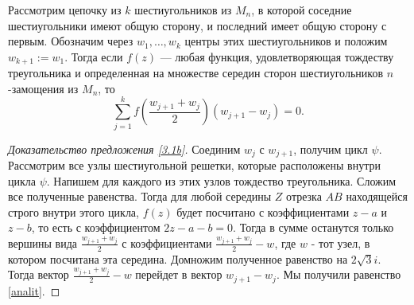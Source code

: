 \begin{suggestion} \label{3.1b}
Рассмотрим цепочку из $k$ шестиугольников из $M_n$, в которой соседние шестиугольники имеют общую сторону, и последний имеет общую сторону с первым. Обозначим через $w_1,\dots, w_{k}$ центры этих шестиугольников и положим $w_{k+1}:=w_1$. Тогда если $f(z)$ --- любая функция, удовлетворяющая тождеству треугольника и определенная на множестве середин сторон шестиугольников $n$-замощения из $M_n$, то
\begin{equation} \label{analit}
\sum\limits_{j=1}^{k} f\left(\frac{w_{j+1}+w_{j}}{2}\right) (w_{j+1}-w_{j})=0.
\end{equation}
\end{suggestion}


\begin{proof}[Доказательство предложения \ref{3.1b}] 
Соединим $w_j$ с $w_{j+1}$, получим цикл $\psi$. Рассмотрим все узлы шестиугольной решетки, которые расположены внутри цикла $\psi$. Напишем для каждого из этих узлов тождество треугольника. Сложим все полученные равенства. Тогда для любой середины $Z$ отрезка $AB$ находящейся строго внутри этого цикла, $f(z)$ будет посчитано с коэффициентами $z-a$ и $z-b$, то есть с коэффициентом $2z-a-b=0$. Тогда в сумме останутся только вершины вида $\frac{w_{j+1} + w_j}{2}$ с коэффициентами $\frac{w_{j+1} + w_j}{2} - w$, где $w$ - тот узел, в котором посчитана эта середина. Домножим полученное равенство на $2\sqrt{3}i$. Тогда вектор $\frac{w_{j+1} + w_j}{2} - w$ перейдет в вектор $w_{j+1} - w_j$. Мы получили равенство \ref{analit}.
\end{proof}